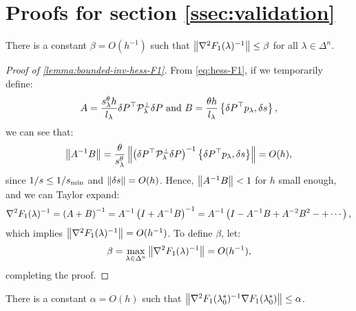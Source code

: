 \documentclass[eikonal.tex]{subfiles}
\begin{document}
\section{Proofs for section
  \ref{ssec:validation}}\label{app:validation-proofs}

\begin{lemma}\label{lemma:bounded-inv-hess-F1}
  There is a constant $\beta = O(h^{-1})$ such that
  $\left\|\nabla^2 F_1(\lambda)^{-1}\right\| \leq \beta$ for all
  $\lambda \in \Delta^n$.
\end{lemma}

\begin{proof}[Proof of \cref{lemma:bounded-inv-hess-F1}]
  From \cref{eq:hess-F1}, if we temporarily define:
  \begin{equation}
    A = \frac{s^\theta_\lambda h}{l_\lambda} \delta P^\top \mathcal{P}^\perp_\lambda \delta P \mbox{ and } B = \frac{\theta h}{l_\lambda} \left\{\delta P^\top p_\lambda, \delta s\right\},
  \end{equation}
  we can see that:
  \begin{equation}
    \left\|A^{-1} B\right\| = \frac{\theta}{s^\theta_\lambda} \left\|\left(\delta P^\top \mathcal{P}^\perp_\lambda \delta P\right)^{-1} \left\{\delta P^\top p_\lambda, \delta s\right\}\right\| = O(h),
  \end{equation}
  since $1/s \leq 1/s_{\operatorname{min}}$ and $\left\|\delta s\right\| = O(h)$. Hence,
  $\left\|A^{-1} B\right\| < 1$ for $h$ small enough, and we can Taylor
  expand:
  \begin{equation}
    \nabla^2 F_1(\lambda)^{-1} = \left(A + B\right)^{-1} = A^{-1} \left(I + A^{-1}B\right)^{-1} = A^{-1} \left(I - A^{-1} B + A^{-2} B^2 - + \cdots\right),
  \end{equation}
  which implies $\left\|\nabla^2 F_1(\lambda)^{-1}\right\| = O(h^{-1})$. To
  define $\beta$, let:
  \begin{equation}
    \beta = \max_{\lambda \in \Delta^n} \left\|\nabla^2 F_1(\lambda)^{-1}\right\| = O(h^{-1}),
  \end{equation}
  completing the proof.
\end{proof}

\begin{lemma}\label{lemma:bounded-first-step}
  There is a constant $\alpha = O(h)$ such that
  $\left\|\nabla^2 F_1(\lambda_{0}^*)^{-1} \nabla F_1(\lambda_{0}^*)\right\|
  \leq \alpha$.
\end{lemma}
\end{document}
